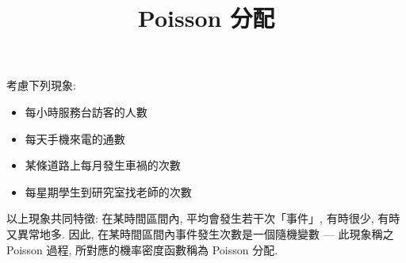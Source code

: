 \documentclass[12pt]{extarticle}
\theoremstyle{definition}
\newcommand{\myline}{\noindent\makebox[\linewidth]{\rule{\paperwidth}{0.4pt}}}
\begin{document}
\title{\texorpdfstring{\vspace{-16mm} Poisson 分配}{Poisson 分配}} 
\author{\vspace{-5em}}
\date{\vspace{-5em}}
\maketitle
\thispagestyle{firststyle}

\myline

\noindent 考慮下列現象:
\begin{multicols}{2}
  \begin{itemize}\setlength{\itemsep}{0pt}
    \item 每小時服務台訪客的人數
    \item 每天手機來電的通數
    \item 某條道路上每月發生車禍的次數
    \item 每星期學生到研究室找老師的次數
  \end{itemize} 
\end{multicols}
\noindent 以上現象共同特徵: 在某時間區間內, 平均會發生若干次「事件」, 有時很少, 有時又異常地多. 因此, 在某時間區間內事件發生次數是一個隨機變數 --- 此現象稱之 Poisson 過程, 所對應的機率密度函數稱為 Poisson 分配.
\end{document}
